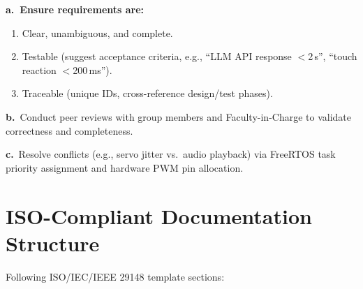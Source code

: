 \documentclass[12pt,a4paper]{article}
\begin{document}
\textbf{a.\ Ensure requirements are:}
\begin{enumerate}[leftmargin=*]
\item Clear, unambiguous, and complete.
\item Testable (suggest acceptance criteria, e.g., ``LLM API response
      $<$2\,s'', ``touch reaction $<$200\,ms'').
\item Traceable (unique IDs, cross-reference design/test phases).
\end{enumerate}

\textbf{b.}\ Conduct peer reviews with group members and Faculty-in-Charge
to validate correctness and completeness.

\textbf{c.}\ Resolve conflicts (e.g., servo jitter vs.\ audio playback)
via FreeRTOS task priority assignment and hardware PWM pin allocation.

\section*{ISO-Compliant Documentation Structure}

Following ISO/IEC/IEEE 29148 template sections:
\end{document}
